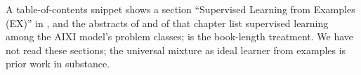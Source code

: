 \begin{remark}\label{rem:learn:hutterEX}
A table-of-contents snippet shows a section ``Supervised Learning from Examples (EX)'' in \citet{hutter2007aixi}, and the abstracts of \citet{hutter2000theory} and of that chapter list supervised learning among the AIXI model's problem classes; \citet{hutter2005universal} is the book-length treatment. We have not read these sections; the universal mixture as ideal learner from examples is prior work in substance.
\end{remark}
